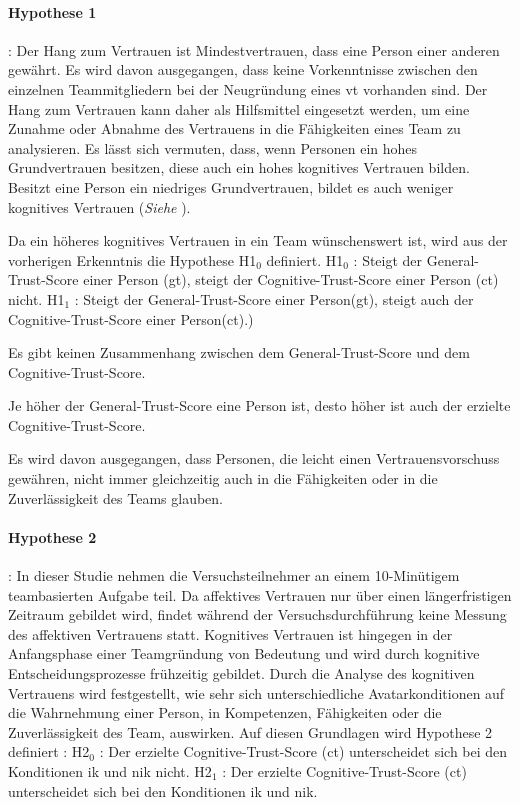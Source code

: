 \documentclass[a4paper,11pt]{article}%
\renewcommand{\\}{\vspace*{0.5\baselineskip} \newline}
\begin{document}
\paragraph{Hypothese 1}:
Der Hang zum Vertrauen ist Mindestvertrauen, dass eine Person einer anderen gewährt. Es wird davon ausgegangen, dass keine Vorkenntnisse zwischen den einzelnen Teammitgliedern bei der Neugründung eines \ac{vt} vorhanden sind. Der Hang zum Vertrauen kann daher als Hilfsmittel eingesetzt werden, um eine Zunahme oder Abnahme des Vertrauens in die Fähigkeiten eines Team zu analysieren.
Es lässt sich vermuten, dass, wenn Personen ein hohes Grundvertrauen besitzen, diese auch ein hohes kognitives Vertrauen bilden. Besitzt eine Person ein niedriges Grundvertrauen, bildet es auch weniger kognitives Vertrauen (\textit{Siehe }). 

Da ein höheres kognitives Vertrauen in ein Team wünschenswert ist, wird aus der vorherigen Erkenntnis die Hypothese H1$_{0}$ definiert.\\
H1$_{0}$ : Steigt der General-Trust-Score einer Person (\ac{gt}), steigt der Cognitive-Trust-Score einer Person (\ac{ct}) nicht. \newline
H1$_{1}$ : Steigt der General-Trust-Score einer Person(\ac{gt}), steigt auch der Cognitive-Trust-Score einer Person(\ac{ct}).)

Es gibt keinen Zusammenhang zwischen dem General-Trust-Score und dem Cognitive-Trust-Score.

Je höher der General-Trust-Score eine Person ist, desto höher ist auch der erzielte Cognitive-Trust-Score.
	
Es wird davon ausgegangen, dass Personen, die leicht einen Vertrauensvorschuss gewähren, nicht immer gleichzeitig auch in die Fähigkeiten oder in die Zuverlässigkeit des Teams glauben.
\paragraph{Hypothese 2}:
In dieser Studie nehmen die Versuchsteilnehmer an einem 10-Minütigem teambasierten Aufgabe teil. Da affektives Vertrauen nur über einen längerfristigen Zeitraum gebildet wird, findet während der Versuchsdurchführung keine Messung des affektiven Vertrauens statt. 
Kognitives Vertrauen ist hingegen in der Anfangsphase einer Teamgründung von Bedeutung und wird durch kognitive Entscheidungsprozesse frühzeitig gebildet. Durch die Analyse des kognitiven Vertrauens wird festgestellt, wie sehr sich unterschiedliche Avatarkonditionen auf die Wahrnehmung einer Person, in Kompetenzen, Fähigkeiten oder die Zuverlässigkeit des Team, auswirken.
Auf diesen Grundlagen wird Hypothese 2 definiert :\\
H2$_{0}$ : Der erzielte Cognitive-Trust-Score (\ac{ct}) unterscheidet sich bei den Konditionen \ac{ik} und \ac{nik} nicht.\newline
H2$_{1}$ : Der erzielte Cognitive-Trust-Score (\ac{ct}) unterscheidet sich bei den Konditionen \ac{ik} und \ac{nik}.
\end{document}
